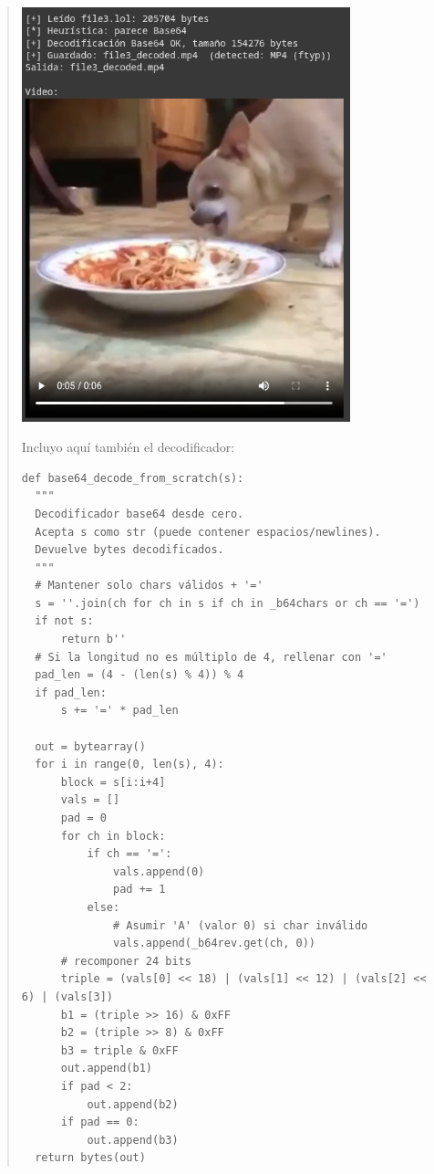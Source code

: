 \begin{quote}
    \begin{center}
    	\includegraphics[height=12cm]{resources/ej3.3.png} 
    \end{center}

    Incluyo aquí también el decodificador: \vspace{.3cm}

    \begin{verbatim}
def base64_decode_from_scratch(s):
  """
  Decodificador base64 desde cero.
  Acepta s como str (puede contener espacios/newlines).
  Devuelve bytes decodificados.
  """
  # Mantener solo chars válidos + '='
  s = ''.join(ch for ch in s if ch in _b64chars or ch == '=')
  if not s:
      return b''
  # Si la longitud no es múltiplo de 4, rellenar con '='
  pad_len = (4 - (len(s) % 4)) % 4
  if pad_len:
      s += '=' * pad_len

  out = bytearray()
  for i in range(0, len(s), 4):
      block = s[i:i+4]
      vals = []
      pad = 0
      for ch in block:
          if ch == '=':
              vals.append(0)
              pad += 1
          else:
              # Asumir 'A' (valor 0) si char inválido
              vals.append(_b64rev.get(ch, 0))
      # recomponer 24 bits
      triple = (vals[0] << 18) | (vals[1] << 12) | (vals[2] << 6) | (vals[3])
      b1 = (triple >> 16) & 0xFF
      b2 = (triple >> 8) & 0xFF
      b3 = triple & 0xFF
      out.append(b1)
      if pad < 2:
          out.append(b2)
      if pad == 0:
          out.append(b3)
  return bytes(out)
    \end{verbatim}
    \vspace{.3cm}
\end{quote} 
\vspace{.5cm}

